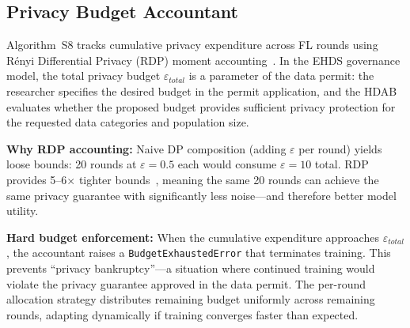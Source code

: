 \documentclass[conference]{IEEEtran}
\begin{document}
\subsection{Privacy Budget Accountant}

Algorithm~S8 tracks cumulative privacy expenditure across FL rounds using R\'enyi Differential Privacy (RDP) moment accounting~\cite{mironov2017renyi}. In the EHDS governance model, the total privacy budget $\varepsilon_{total}$ is a parameter of the data permit: the researcher specifies the desired budget in the permit application, and the HDAB evaluates whether the proposed budget provides sufficient privacy protection for the requested data categories and population size.

\textbf{Why RDP accounting:} Naive DP composition (adding $\varepsilon$ per round) yields loose bounds: 20 rounds at $\varepsilon{=}0.5$ each would consume $\varepsilon{=}10$ total. RDP provides 5--6$\times$ tighter bounds~\cite{mironov2017renyi, wei2020federated}, meaning the same 20 rounds can achieve the same privacy guarantee with significantly less noise---and therefore better model utility.

\textbf{Hard budget enforcement:} When the cumulative expenditure approaches $\varepsilon_{total}$, the accountant raises a \texttt{BudgetExhaustedError} that terminates training. This prevents ``privacy bankruptcy''---a situation where continued training would violate the privacy guarantee approved in the data permit. The per-round allocation strategy distributes remaining budget uniformly across remaining rounds, adapting dynamically if training converges faster than expected.
\end{document}
